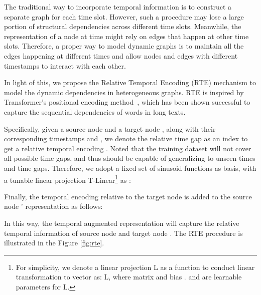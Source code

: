 \documentclass[sigconf]{acmart}
\theoremstyle{definition}
\begin{document}
The traditional way to incorporate temporal information is to construct a separate graph for each time slot. 
However, such a procedure may lose a large portion of structural dependencies across different time slots. 
Meanwhile, the representation of a node at time  might rely on edges that happen at other time slots. 
Therefore, a proper way to model dynamic graphs is to maintain all the edges happening at different times and allow nodes and edges with different timestamps to interact with each other.

In light of this, we propose the Relative Temporal Encoding (RTE) mechanism to model the dynamic dependencies in heterogeneous graphs. 
RTE is inspired by Transformer's positional encoding method~\cite{DBLP:conf/nips/VaswaniSPUJGKP17, DBLP:conf/naacl/ShawUV18}, which has been shown successful to capture the sequential dependencies of words in long texts. 

Specifically, given a source node  and a target node , along with their corresponding timestamps  and , we denote the relative time gap  as an index to get a relative temporal encoding . 
Noted that the training dataset will not cover all possible time gaps, and thus   should be capable of generalizing to unseen times and time gaps. 
Therefore, we adopt a fixed set of sinusoid functions as basis, with a tunable linear projection T-Linear\footnote{For simplicity, we denote a linear projection L  as a function to conduct linear transformation to vector  as: L, where matrix  and bias .  and  are learnable parameters for L.} as :

Finally, the temporal encoding relative to the target node  is added to the source node ' representation as follows:

In this way, the temporal augmented representation  will capture the relative temporal information of source node  and target node . The RTE procedure is illustrated in the Figure \ref{fig:rte}. 
\end{document}
